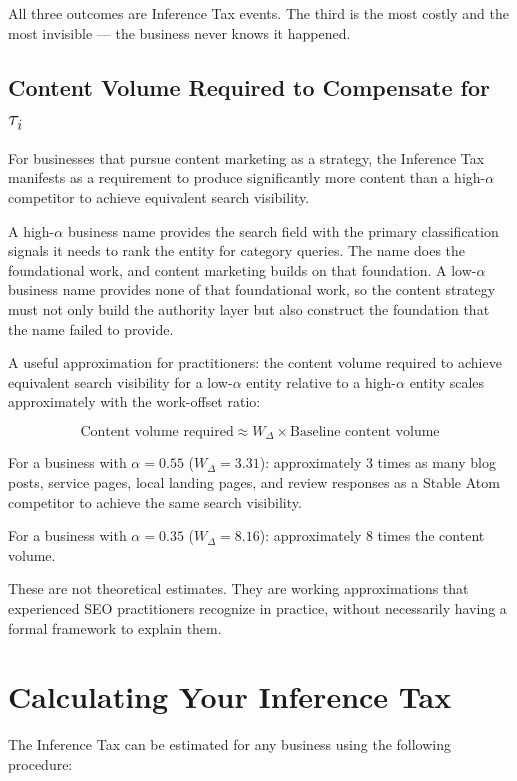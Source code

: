 \documentclass[12pt, openany]{book}
\theoremstyle{thmstyle}
\theoremstyle{defstyle}
\newcommand{\Wdelta}{W_{\Delta}}
\begin{document}
All three outcomes are Inference Tax events. The third is the most costly and the most invisible --- the business never knows it happened.

\subsection{Content Volume Required to Compensate for $\tau_i$}

For businesses that pursue content marketing as a strategy, the Inference Tax manifests as a requirement to produce significantly more content than a high-$\alpha$ competitor to achieve equivalent search visibility.

A high-$\alpha$ business name provides the search field with the primary classification signals it needs to rank the entity for category queries. The name does the foundational work, and content marketing builds on that foundation. A low-$\alpha$ business name provides none of that foundational work, so the content strategy must not only build the authority layer but also construct the foundation that the name failed to provide.

\begin{calcbox}
A useful approximation for practitioners: the content volume required to achieve equivalent search visibility for a low-$\alpha$ entity relative to a high-$\alpha$ entity scales approximately with the work-offset ratio:

\[
\text{Content volume required} \approx \Wdelta \times \text{Baseline content volume}
\]

For a business with $\alpha = 0.55$ ($\Wdelta = 3.31$): approximately 3 times as many blog posts, service pages, local landing pages, and review responses as a Stable Atom competitor to achieve the same search visibility.

For a business with $\alpha = 0.35$ ($\Wdelta = 8.16$): approximately 8 times the content volume.

These are not theoretical estimates. They are working approximations that experienced SEO practitioners recognize in practice, without necessarily having a formal framework to explain them.
\end{calcbox}

\section{Calculating Your Inference Tax}

The Inference Tax can be estimated for any business using the following procedure:
\end{document}
